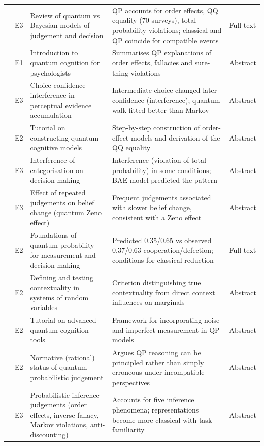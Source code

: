 \documentclass[10pt,a4paper]{article}
\begin{document}
\begin{longtable}{@{}P{3.6cm}P{0.7cm}P{4.6cm}P{6.2cm}P{1.1cm}@{}}
\citet{Bruza2015} & E3 & Review of quantum vs Bayesian models of judgement and decision & QP accounts for order effects, QQ equality (70 surveys), total-probability violations; classical and QP coincide for compatible events & Full text \\
\citet{Busemeyer2015} & E1 & Introduction to quantum cognition for psychologists & Summarises QP explanations of order effects, fallacies and sure-thing violations & Abstract \\
\citet{Kvam2015} & E3 & Choice-confidence interference in perceptual evidence accumulation & Intermediate choice changed later confidence (interference); quantum walk fitted better than Markov & Abstract \\
\citet{Yearsley2016a} & E2 & Tutorial on constructing quantum cognitive models & Step-by-step construction of order-effect models and derivation of the QQ equality & Abstract \\
\citet{Wang2016} & E3 & Interference of categorisation on decision-making & Interference (violation of total probability) in some conditions; BAE model predicted the pattern & Abstract \\
\citet{Yearsley2016b} & E3 & Effect of repeated judgements on belief change (quantum Zeno effect) & Frequent judgements associated with slower belief change, consistent with a Zeno effect & Abstract \\
\citet{Yukalov2016} & E2 & Foundations of quantum probability for measurement and decision-making & Predicted 0.35/0.65 vs observed 0.37/0.63 cooperation/defection; conditions for classical reduction & Full text \\
\citet{Dzhafarov2016a} & E2 & Defining and testing contextuality in systems of random variables & Criterion distinguishing true contextuality from direct context influences on marginals & Abstract \\
\citet{Yearsley2017} & E2 & Tutorial on advanced quantum-cognition tools & Framework for incorporating noise and imperfect measurement in QP models & Abstract \\
\citet{Pothos2017} & E2 & Normative (rational) status of quantum probabilistic judgement & Argues QP reasoning can be principled rather than simply erroneous under incompatible perspectives & Abstract \\
\citet{Trueblood2017a} & E3 & Probabilistic inference judgements (order effects, inverse fallacy, Markov violations, anti-discounting) & Accounts for five inference phenomena; representations become more classical with task familiarity & Abstract \\

\end{longtable}
\end{document}
